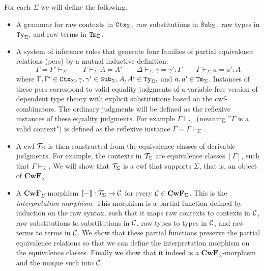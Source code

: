 \documentclass{lmcs}
\def\Cwf{\mathbf{CwF}}
\begin{document}
For each $\Sigma$ we will define the following.
\begin{itemize}
\item 
A grammar for raw contexts in ${\tt Ctx}_\Sigma$, raw substitutions in ${\tt Sub}_\Sigma$, raw types in ${\tt Ty}_\Sigma$, and raw terms in ${\tt Tm}_\Sigma$. 
\item
A system of inference rules that generate four families of partial equivalence relations (pers) by a mutual inductive definition:
$$
\Gamma = \Gamma' \vdash_\Sigma
\qquad
\Gamma \vdash_\Sigma A = A' 
\qquad
\Delta \vdash_\Sigma \gamma = \gamma' : \Gamma
\qquad
\Gamma \vdash_\Sigma a = a' : A
$$
where $\Gamma, \Gamma' \in {\tt Ctx}_\Sigma, \gamma, \gamma' \in {\tt Sub}_\Sigma, A, A' \in {\tt Ty}_\Sigma,$ and $a,a' \in {\tt Tm}_\Sigma$. Instances of these pers correspond to valid equality judgments of a variable free version of dependent type theory with explicit substitutions based on the cwf-combinators. The ordinary judgments will be defined as the reflexive instances of these equality judgments. For example $\Gamma \vdash_\Sigma$ (meaning ”$\Gamma$ is a valid context") is defined as the reflexive instance $\Gamma = \Gamma \vdash_\Sigma$.
\item
A cwf ${\mathcal T}_\Sigma$ is then constructed from the equivalence classes of derivable judgments. For example, the contexts in ${\mathcal T}_\Sigma$ are equivalence classes $[\Gamma]$, such that $\Gamma \vdash_\Sigma$. We will show that ${\mathcal T}_\Sigma$ is a cwf that supports $\Sigma$, that is, an object of $\Cwf_\Sigma$.
\item
A $\Cwf_\Sigma$-morphism $\llbracket - \rrbracket : {\mathcal T}_\Sigma \to {\mathcal C}$ for every $\C \in \Cwf_\Sigma$. This is the {\em interpretation morphism}. This morphism is a partial function defined by induction on the raw syntax, such that it maps raw contexts to contexts in ${\mathcal C}$, raw substitutions to substitutions in ${\mathcal C}$, raw types to types in ${\mathcal C}$, and raw terms to terms in ${\mathcal C}$. We show that these partial functions preserve the partial equivalence relations so that we can define the interpretation morphism on the equivalence classes. Finally we show that it indeed is a $\Cwf_\Sigma$-morphism and the unique such into ${\mathcal C}$.
\end{itemize}
 
\end{document}
